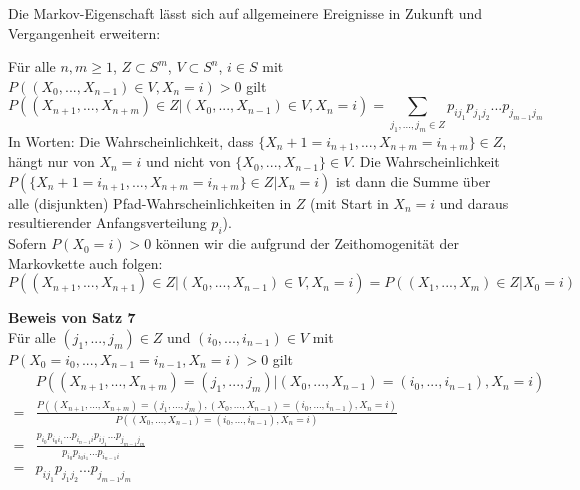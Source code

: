 \documentclass[a4paper,12pt]{article}
\begin{document}
Die Markov-Eigenschaft lässt sich auf allgemeinere Ereignisse in Zukunft und Vergangenheit erweitern: \\

\begin{tcolorbox}[breakable, colframe=green, colback=white, title=Satz 7]
Für alle $n, m \geq 1$, $Z \subset S^m$, $V \subset S^n$, $i \in S$ mit $P((X_0, ..., X_{n-1})\in V,X_n = i) > 0$ gilt
$$
P((X_{n+1}, ..., X_{n+m})\in Z | (X_0, ..., X_{n-1}) \in V, X_n = i) = \sum_{j_1, ..., j_m \in Z} p_{ij_1}p_{j_1j_2}...p_{j_{m-1}j_m}
$$
In Worten: Die Wahrscheinlichkeit, dass $\{X_n+1 = i_{n+1}, ..., X_{n+m}=i_{n+m}\} \in Z$, hängt nur von $X_n = i$ und nicht von 
$\{X_0, ..., X_{n-1}\} \in V$. Die Wahrscheinlichkeit $P(\{X_n+1 = i_{n+1}, ..., X_{n+m}=i_{n+m}\} \in Z | X_n = i)$ ist dann die Summe
über alle (disjunkten) Pfad-Wahrscheinlichkeiten in $Z$ (mit Start in $X_n = i$ und daraus resultierender Anfangsverteilung $p_i$).\\
Sofern $P(X_0 = i) > 0$ können wir die aufgrund der Zeithomogenität der Markovkette auch folgen:
$$
P((X_{n+1}, ..., X_{n+1})\in Z | (X_0, ..., X_{n-1})\in V, X_n = i) = P((X_1, ..., X_m)\in Z | X_0 = i)
$$
\end{tcolorbox}

\textbf{Beweis von Satz 7}\\
Für alle $(j_1, ..., j_m) \in Z$ und $(i_0, ..., i_{n-1}) \in V$ mit
$P(X_0 = i_0, ..., X_{n-1}=i_{n-1}, X_n = i) > 0$ gilt
\begin{align*}
&P((X_{n+1}, ..., X_{n+m}) = (j_1, ..., j_m) | (X_0, ..., X_{n-1}) = (i_0, ..., i_{n-1}), X_n = i) \\
=& \frac{P((X_{n+1}, ..., X_{n+m}) = (j_1, ..., j_m), (X_0, ..., X_{n-1}) = (i_0, ..., i_{n-1}), X_n = i)}{P((X_0, ..., X_{n-1}) = (i_0, ..., i_{n-1}), X_n = i)}\\
=&\frac{p_{i_0}p_{i_0i_1}...p_{i_{n-1}i}p_{ij_1}...p_{j_{m-1}j_m}}{p_{i_0}p_{i_0i_1}...p_{i_{n-1}i}} \\
 =& p_{ij_1}p_{j_1j_2}...p_{j_{m-1}j_m}
\end{align*}
\end{document}
